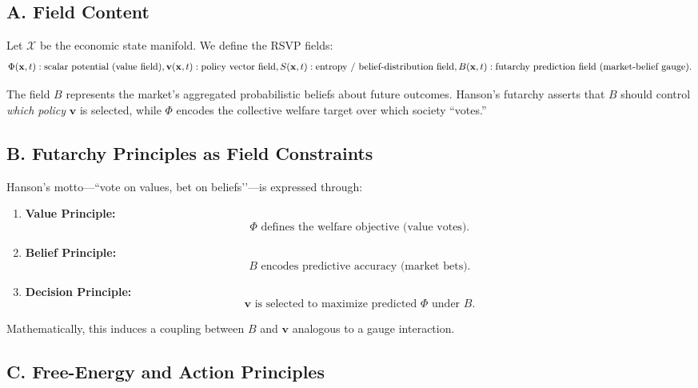 \documentclass[12pt]{article}
\begin{document}
\subsection*{A. Field Content}

Let $\mathcal{X}$ be the economic state manifold. We define the RSVP
fields:
\[
\Phi(\mathbf{x},t): \text{scalar potential (value field)},\\[4pt]
\mathbf{v}(\mathbf{x},t): \text{policy vector field},\\[4pt]
S(\mathbf{x},t): \text{entropy / belief-distribution field},\\[4pt]
B(\mathbf{x},t): \text{futarchy prediction field (market-belief gauge)}.
\]

The field $B$ represents the market’s aggregated probabilistic beliefs
about future outcomes. Hanson’s futarchy asserts that $B$ should control
\emph{which policy} $\mathbf{v}$ is selected, while $\Phi$ encodes the
collective welfare target over which society “votes.”

\subsection*{B. Futarchy Principles as Field Constraints}

Hanson’s motto—``vote on values, bet on beliefs’’—is expressed through:
\begin{enumerate}
    \item \textbf{Value Principle:}
        \[
        \Phi \text{ defines the welfare objective (value votes).}
        \]
    \item \textbf{Belief Principle:}
        \[
        B \text{ encodes predictive accuracy (market bets).}
        \]
    \item \textbf{Decision Principle:}
        \[
        \mathbf{v} \text{ is selected to maximize predicted } \Phi
        \text{ under } B.
        \]
\end{enumerate}

Mathematically, this induces a coupling between $B$ and $\mathbf{v}$
analogous to a gauge interaction.

\subsection*{C. Free-Energy and Action Principles}
\end{document}
